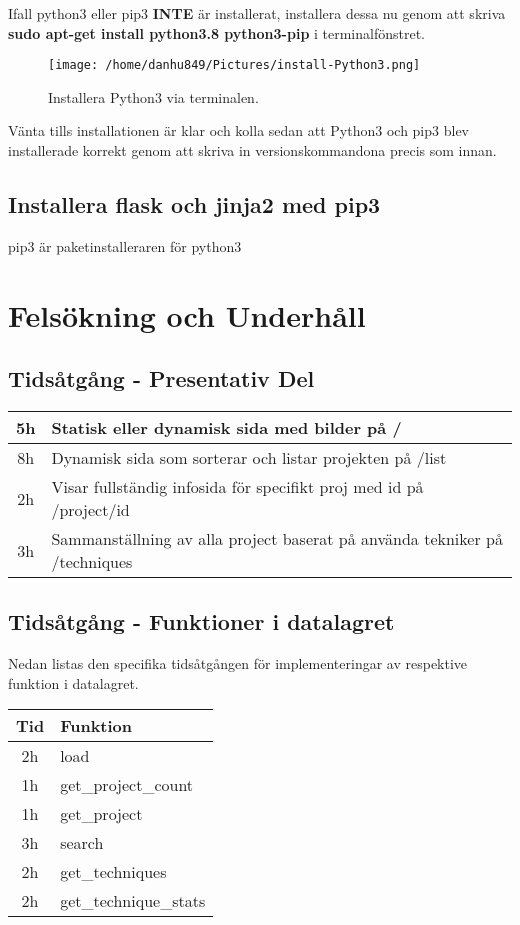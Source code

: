 \documentclass{TDP003mall}
\begin{document}
Ifall python3 eller pip3 \textbf{INTE} är installerat, installera dessa nu genom att skriva \textbf{sudo apt-get install python3.8 python3-pip} i terminalfönstret.
\begin{figure}[htbp]
  \centerline{\texttt{[image: /home/danhu849/Pictures/install-Python3.png]}}
  \caption{Installera Python3 via terminalen.}
  \label{fig}
\end{figure}
Vänta tills installationen är klar och kolla sedan att Python3 och pip3 blev installerade korrekt genom att skriva in versionskommandona precis som innan.

\subsection{Installera flask och jinja2 med pip3}
pip3 är paketinstalleraren för python3



\section{Felsökning och Underhåll}


\subsection{Tidsåtgång - Presentativ Del}
\begin{tabular}{|c|l|}
  \hline
  5h & Statisk eller dynamisk sida med bilder på /\\
  \hline
  8h & Dynamisk sida som sorterar och listar projekten på /list\\
  \hline
  2h & Visar fullständig infosida för specifikt proj med id på /project/id\\
  \hline
  3h & Sammanställning av alla project baserat på använda tekniker på /techniques\\
  \hline
\end{tabular}

\subsection{Tidsåtgång - Funktioner i datalagret}
Nedan listas den specifika tidsåtgången för implementeringar av respektive funktion i datalagret.

\begin{tabular}{|c|l|}
  \hline
  Tid & Funktion\\
  \hline
  2h & load\\
  \hline
  1h & get\_project\_count\\
  \hline
  1h & get\_project\\
  \hline
  3h & search\\
  \hline
  2h & get\_techniques\\
  \hline
  2h & get\_technique\_stats\\
  \hline
\end{tabular}
\end{document}
